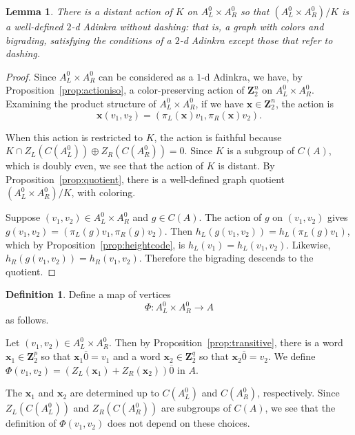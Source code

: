 \documentclass[12pt,twoside,singlespace]{article}
\numberwithin{equation}{section}
\newtheorem{lem}[equation]{Lemma}
\theoremstyle{definition}
\newtheorem{definition}[equation]{Definition}
\newcommand{\ZZ}{\mathbf{Z}}
\renewcommand{\vec}[1]{\mathbf{#1}}
\begin{document}
\begin{lem}
\label{lem:kquotient}
There is a distant action of $K$ on $A_L^0\times A_R^0$ so that $(A_L^0\times A_R^0)/K$ is a well-defined $2$-d Adinkra without dashing: that is, a graph with colors and bigrading, satisfying the conditions of a $2$-d Adinkra except those that refer to dashing.
\end{lem}
\begin{proof}
Since $A_L^0\times A_R^0$ can be considered as a $1$-d Adinkra, we have, by Proposition~\ref{prop:actioniso}, a color-preserving action of $\ZZ_2^n$ on $A_L^0\times A_R^0$.  Examining the product structure of $A_L^0\times A_R^0$, if we have $\vec{x}\in \ZZ_2^n$, the action is
\[\vec{x}(v_1,v_2)=(\pi_L(\vec{x})v_1,\pi_R(\vec{x})v_2).\]


When this action is restricted to $K$, the action is faithful because $K\cap Z_L(C(A_L^0))\oplus Z_R(C(A_R^0))=0$.  Since $K$ is a subgroup of $C(A)$, which is doubly even, we see that the action of $K$ is distant.  By Proposition~\ref{prop:quotient}, there is a well-defined graph quotient $(A_L^0\times A_R^0)/K$, with coloring.

Suppose $(v_1,v_2)\in A_L^0\times A_R^0$ and $g\in C(A)$.  The action of $g$ on $(v_1,v_2)$ gives $g(v_1,v_2)=(\pi_L(g)v_1,\pi_R(g)v_2)$.  Then $h_L(g(v_1,v_2))=h_L(\pi_L(g)v_1)$, which by Proposition~\ref{prop:heightcode}, is $h_L(v_1)=h_L(v_1,v_2)$.  Likewise, $h_R(g(v_1,v_2))=h_R(v_1,v_2)$.  Therefore the bigrading descends to the quotient.
\end{proof}

\begin{definition}
Define a map of vertices
\[\Phi:A_L^0\times A_R^0 \to A\]
as follows.

Let $(v_1,v_2)\in A_L^0\times A_R^0$.  Then by Proposition~\ref{prop:transitive}, there is a word $\vec{x}_1\in \ZZ_2^p$ so that $\vec{x}_1\overline{0}=v_1$ and a word $\vec{x}_2 \in\ZZ_2^q$ so that $\vec{x}_2\overline{0}=v_2$.  We define $\Phi(v_1,v_2)=(Z_L(\vec{x}_1)+Z_R(\vec{x}_2))\overline{0}$ in $A$.

The $\vec{x}_1$ and $\vec{x}_2$ are determined up to $C(A_L^0)$ and $C(A_R^0)$, respectively.  Since $Z_L(C(A_L^0))$ and $Z_R(C(A_R^0))$ are subgroups of $C(A)$, we see that the definition of $\Phi(v_1,v_2)$ does not depend on these choices.
\end{definition}
\end{document}
